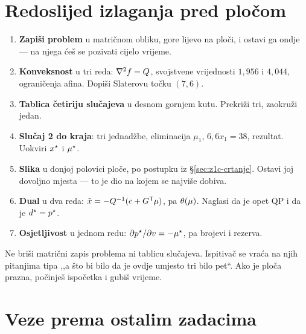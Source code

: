 \section{Redoslijed izlaganja pred pločom}
\label{sec:z1o-redoslijed}

\begin{ploca}
\begin{enumerate}[leftmargin=*]
  \item \textbf{Zapiši problem} u matričnom obliku, gore lijevo na ploči, i ostavi
        ga ondje --- na njega ćeš se pozivati cijelo vrijeme.
  \item \textbf{Konveksnost} u tri reda: $\nabla^2 f = Q$, svojstvene vrijednosti
        $1{,}956$ i $4{,}044$, ograničenja afina. Dopiši Slaterovu točku $(7,6)$.
  \item \textbf{Tablica četiriju slučajeva} u desnom gornjem kutu. Prekriži tri,
        zaokruži jedan.
  \item \textbf{Slučaj 2 do kraja}: tri jednadžbe, eliminacija $\mu_1$,
        $6{,}6x_1 = 38$, rezultat. Uokviri $x^{\star}$ i $\mu^{\star}$.
  \item \textbf{Slika} u donjoj polovici ploče, po postupku iz
        \S\ref{sec:z1c-crtanje}. Ostavi joj dovoljno mjesta --- to je dio na kojem
        se najviše dobiva.
  \item \textbf{Dual} u dva reda: $\tilde{x} = -Q^{-1}(c + G^{\mathsf{T}}\mu)$, pa
        $\theta(\mu)$. Naglasi da je opet QP i da je $d^{\star} = p^{\star}$.
  \item \textbf{Osjetljivost} u jednom redu: $\partial p^{\star}/\partial v = -\mu^{\star}$,
        pa brojevi i rezerva.
\end{enumerate}
\end{ploca}

\begin{zamka}
Ne briši matrični zapis problema ni tablicu slučajeva. Ispitivač se vraća na njih
pitanjima tipa ,,a što bi bilo da je ovdje umjesto tri bilo pet``. Ako je ploča
prazna, počinješ ispočetka i gubiš vrijeme.
\end{zamka}

\section{Veze prema ostalim zadacima}
\label{sec:z1o-veze}


